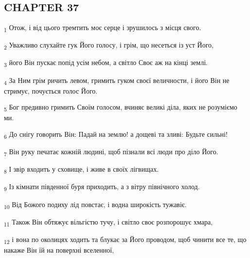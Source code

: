 \subsection{CHAPTER 37}
\begin{tcolorbox}
\textsubscript{1} Отож, і від цього тремтить моє серце і зрушилось з місця свого.
\end{tcolorbox}
\begin{tcolorbox}
\textsubscript{2} Уважливо слухайте гук Його голосу, і грім, що несеться із уст Його,
\end{tcolorbox}
\begin{tcolorbox}
\textsubscript{3} його Він пускає попід усім небом, а світло Своє аж на кінці землі.
\end{tcolorbox}
\begin{tcolorbox}
\textsubscript{4} За Ним грім ричить левом, гримить гуком своєї величности, і його Він не стримує, почується голос Його.
\end{tcolorbox}
\begin{tcolorbox}
\textsubscript{5} Бог предивно гримить Своїм голосом, вчиняє великі діла, яких не розуміємо ми.
\end{tcolorbox}
\begin{tcolorbox}
\textsubscript{6} До снігу говорить Він: Падай на землю! а дощеві та зливі: Будьте сильні!
\end{tcolorbox}
\begin{tcolorbox}
\textsubscript{7} Він руку печатає кожній людині, щоб пізнали всі люди про діло Його.
\end{tcolorbox}
\begin{tcolorbox}
\textsubscript{8} І звір входить у сховище, і живе в своїх лігвищах.
\end{tcolorbox}
\begin{tcolorbox}
\textsubscript{9} Із кімнати південної буря приходить, а з вітру північного холод.
\end{tcolorbox}
\begin{tcolorbox}
\textsubscript{10} Від Божого подиху лід повстає, і водна широкість тужавіє.
\end{tcolorbox}
\begin{tcolorbox}
\textsubscript{11} Також Він обтяжує вільгістю тучу, і світло своє розпорошує хмара,
\end{tcolorbox}
\begin{tcolorbox}
\textsubscript{12} і вона по околицях ходить та блукає за Його проводом, щоб чинити все те, що накаже Він їй на поверхні вселенної,
\end{tcolorbox}
